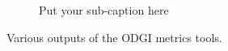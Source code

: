 \begin{figure}[h!]
\begin{subfigure}{.5\linewidth}
		\caption{Put your sub-caption here}
		\label{fig:sub-fourth}
	\end{subfigure}
	\caption{Various outputs of the ODGI metrics tools.}
	\label{fig:metrics}
\end{figure}